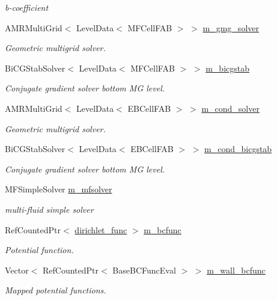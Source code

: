 \begin{DoxyCompactItemize}
\begin{DoxyCompactList}\small\item\em b-\/coefficient \end{DoxyCompactList}\item 
A\+M\+R\+Multi\+Grid$<$ Level\+Data$<$ M\+F\+Cell\+F\+AB $>$ $>$ \hyperlink{classpoisson__multifluid__gmg_a95792ebbba23fe15b0b24fb858d999f6}{m\+\_\+gmg\+\_\+solver}
\begin{DoxyCompactList}\small\item\em Geometric multigrid solver. \end{DoxyCompactList}\item 
Bi\+C\+G\+Stab\+Solver$<$ Level\+Data$<$ M\+F\+Cell\+F\+AB $>$ $>$ \hyperlink{classpoisson__multifluid__gmg_ab7efda832efdba8c99625bbf71c90b17}{m\+\_\+bicgstab}
\begin{DoxyCompactList}\small\item\em Conjugate gradient solver bottom MG level. \end{DoxyCompactList}\item 
A\+M\+R\+Multi\+Grid$<$ Level\+Data$<$ E\+B\+Cell\+F\+AB $>$ $>$ \hyperlink{classpoisson__multifluid__gmg_aff9ba8c258a0f2cabd8230e11d5c9da0}{m\+\_\+cond\+\_\+solver}
\begin{DoxyCompactList}\small\item\em Geometric multigrid solver. \end{DoxyCompactList}\item 
Bi\+C\+G\+Stab\+Solver$<$ Level\+Data$<$ E\+B\+Cell\+F\+AB $>$ $>$ \hyperlink{classpoisson__multifluid__gmg_a5ec223edbc016dacab78c4aca79abdd0}{m\+\_\+cond\+\_\+bicgstab}
\begin{DoxyCompactList}\small\item\em Conjugate gradient solver bottom MG level. \end{DoxyCompactList}\item 
M\+F\+Simple\+Solver \hyperlink{classpoisson__multifluid__gmg_a83739ab34f2b38ec4d7a60d20399322b}{m\+\_\+mfsolver}
\begin{DoxyCompactList}\small\item\em multi-\/fluid simple solver \end{DoxyCompactList}\item 
Ref\+Counted\+Ptr$<$ \hyperlink{classdirichlet__func}{dirichlet\+\_\+func} $>$ \hyperlink{classpoisson__multifluid__gmg_a695568c8da86e4c3ebd8f1f5b74b126d}{m\+\_\+bcfunc}
\begin{DoxyCompactList}\small\item\em Potential function. \end{DoxyCompactList}\item 
Vector$<$ Ref\+Counted\+Ptr$<$ Base\+B\+C\+Func\+Eval $>$ $>$ \hyperlink{classpoisson__multifluid__gmg_a757da03ff336cf79b78b00aabe2205b5}{m\+\_\+wall\+\_\+bcfunc}
\begin{DoxyCompactList}\small\item\em Mapped potential functions. \end{DoxyCompactList}\end{DoxyCompactItemize}


